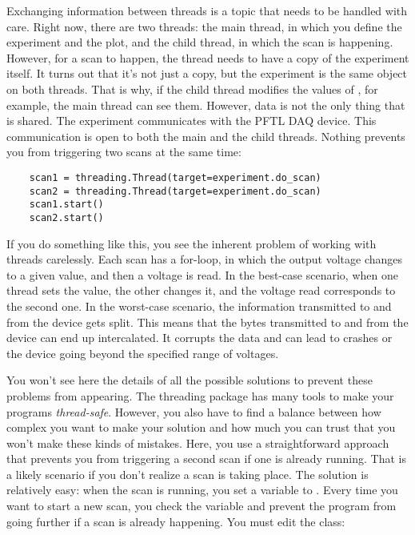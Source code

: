 Exchanging information between threads is a topic that needs to be handled with care. Right now, there are two threads: the main thread, in which you define the experiment and the plot, and the child thread, in which the scan is happening. However, for a scan to happen, the thread needs to have a copy of the experiment itself. It turns out that it's not just a copy, but the experiment is the same object on both threads. That is why, if the child thread modifies the values of , for example, the main thread can see them. However, data is not the only thing that is shared. The experiment communicates with the {PFTL DAQ} device. This communication is open to both the main and the child threads. Nothing prevents you from triggering two scans at the same time:

\begin{verbatim}
    scan1 = threading.Thread(target=experiment.do_scan)
    scan2 = threading.Thread(target=experiment.do_scan)
    scan1.start()
    scan2.start()
\end{verbatim}

If you do something like this, you see the inherent problem of working with threads carelessly. Each scan has a for-loop, in which the output voltage changes to a given value, and then a voltage is read. In the best-case scenario, when one thread sets the value, the other changes it, and the voltage read corresponds to the second one. In the worst-case scenario, the information transmitted to and from the device gets split. This means that the bytes transmitted to and from the device can end up intercalated. It corrupts the data and can lead to crashes or the device going beyond the specified range of voltages.

You won't see here the details of all the possible solutions to prevent these problems from appearing. The threading package has many tools to make your programs \emph{thread-safe}. However, you also have to find a balance between how complex you want to make your solution and how much you can trust that you won't make these kinds of mistakes. Here, you use a straightforward approach that prevents you from triggering a second scan if one is already running. That is a likely scenario if you don't realize a scan is taking place. The solution is relatively easy: when the scan is running, you set a variable to . Every time you want to start a new scan, you check the variable and prevent the program from going further if a scan is already happening. You must edit the  class:

